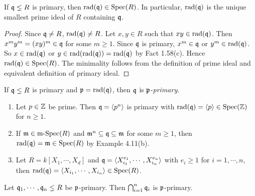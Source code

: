 \begin{proposition}
    If $\mathfrak{q} \lneq R$ is primary, then $\operatorname{rad}(\mathfrak{q}) \in \operatorname{Spec}(R)$. In particular, $\operatorname{rad}(\mathfrak{q})$ is the unique smallest prime ideal of $R$ containing $\mathfrak{q}$.
\end{proposition}

\begin{proof}
    Since $\mathfrak{q} \neq R$, $\operatorname{rad}(\mathfrak{q}) \neq R$. Let $x,y \in R$ such that $xy \in \operatorname{rad}(\mathfrak{q})$. Then $x^{m}y^{m} = (xy)^{m} \in \mathfrak{q}$ for some $m \geq 1$. Since $\mathfrak{q}$ is primary, $x^{m} \in \mathfrak{q}$ or $y^{m} \in \operatorname{rad}(\mathfrak{q})$. So $x \in \operatorname{rad}(\mathfrak{q})$ or $y \in \operatorname{rad}(\operatorname{rad}(\mathfrak{q})) = \operatorname{rad}(\mathfrak{q})$ by Fact 1.58(c). Hence $\operatorname{rad}(\mathfrak{q}) \in \operatorname{Spec}(R)$. The minimality follows from the definition of prime ideal and equivalent definition of primary ideal.
\end{proof}

\begin{definition}
    If $\mathfrak{q} \lneq R$ is primary and $\mathfrak{p} = \operatorname{rad}(\mathfrak{q})$, then $\mathfrak{q}$ is $\mathfrak{p}$-\emph{primary}.
\end{definition}

\begin{example}
    \begin{enumerate}
        \item Let $p \in \mathbb{Z}$ be prime. Then $\mathfrak{q} = \langle  p^{n} \rangle$ is primary with $\operatorname{rad}(\mathfrak{q}) = \langle p  \rangle \in \operatorname{Spec}(\mathbb{Z})$ for $n \geq 1$.
        \item 
            If $\mathfrak{m} \in \operatorname{m-Spec}(R)$ and $\mathfrak{m}^{n} \subseteq \mathfrak{q} \subseteq \mathfrak{m}$ for some $m \geq 1$, then $\operatorname{rad}(\mathfrak{q}) = \mathfrak{m} \in \operatorname{Spec}(R)$ by Example 4.11(b).
        \item Let $R = k[X_1,\cdots,X_d]$ and $\mathfrak{q} = \langle X_{i_1}^{e_{1}},\cdots,X_{i_n}^{e_{n}} \rangle$ with $e_i \geq 1$ for $i=1,\cdots,n$, then $\operatorname{rad}(\mathfrak{q}) = \langle X_{i_1},\cdots,X_{i_n} \rangle \in \operatorname{Spec}(R)$.
    \end{enumerate}
\end{example}

\begin{proposition}
    Let $\mathfrak{q}_1,\cdots,\mathfrak{q}_n \lneq R$ be $\mathfrak{p}$-primary. Then $\bigcap_{i=1}^{n} \mathfrak{q}_i$ is $\mathfrak{p}$-primary.
\end{proposition}


